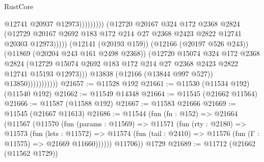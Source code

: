\begin{lexlean}{RustCore}
\begin{coremodule}
                                                    @12741
                                                    @20937
                                                    @12973)))))))))
                                  (@12720
                                    @20167
                                    @324
                                    @172
                                    @2368
                                    @2824
                                    (@12729
                                      @20167
                                      @2692
                                      @183
                                      @172
                                      @214
                                      @27
                                      @2368
                                      @2423
                                      @2822
                                      @12741
                                      @20303
                                      @12973)))))
                            (@12141 (@20193 @159))
                            (@12166 (@20197 @526 @243))
                            (@11869 (@20204 @243 @161 @2498 @2368))
                            (@12720
                              @15074
                              @324
                              @172
                              @2368
                              @2824
                              (@12729
                                @15074
                                @2692
                                @183
                                @172
                                @214
                                @27
                                @2368
                                @2423
                                @2822
                                @12741
                                @15193
                                @12973)))
                          @13838
                          (@12166 (@13844 @997 @527))
                          @13850)))))))))))
@21657 := @11528 @192
@21661 := @11530 (@11534 @192) (@11540 @192)
@21662 := @11549 @14348
@21664 := @11545 (@21662 @11564)
@21666 := @11587 (@11588 @192)
@21667 := @11583 @21666
@21669 := @11545 (@21667 @11613)
@21686 := @11544
    (fun (fn : @152) =>
    @21664
      (@11567
        (@11570
          (fun (params : @11569) =>
          @11571
            (fun (rty : @2180) =>
            @11573
              (fun (lets : @11572) =>
              @11574 (fun (tail : @2410) => @11576 (fun (Γ : @11575) => @21669 @11660))))))
        @11706))
    @1729
@21689 := @11712 (@21662 (@11562 @1729))

\end{coremodule}
\end{lexlean}
